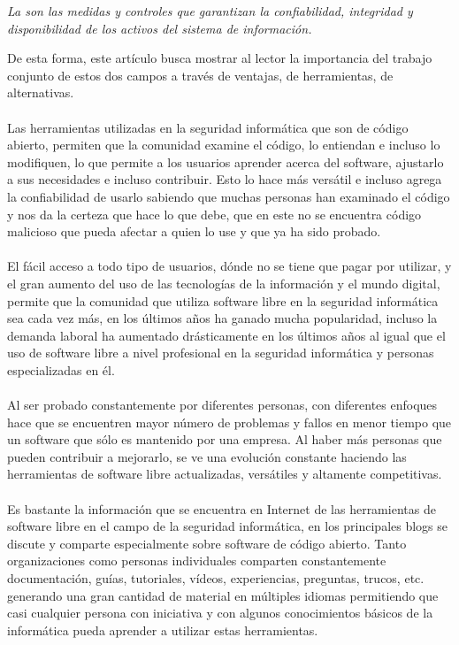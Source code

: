 \begin{multicols}{2}
\vspace{0.3cm}

\begin{entradilla}
{\em La {\color{introcolor}{seguridad informática}} son las medidas y controles que garantizan la confiabilidad, integridad y disponibilidad de los activos del sistema de información.}
\end{entradilla}

De esta forma, este artículo busca mostrar al lector la importancia del trabajo conjunto de estos dos campos a través de ventajas, de herramientas, de alternativas.
\\ \\


Las herramientas utilizadas en la seguridad informática que son de código abierto, permiten que la comunidad examine el código, lo entiendan e incluso lo modifiquen, lo que permite a los usuarios aprender acerca del software, ajustarlo a sus necesidades e incluso contribuir. Esto lo hace más versátil e incluso agrega la confiabilidad de usarlo sabiendo que muchas personas han examinado el código y nos da la certeza que hace lo que debe, que en este no se encuentra código malicioso que pueda afectar a quien lo use y que ya ha sido probado.
\\
\\
El fácil acceso a todo tipo de usuarios, dónde no se tiene que pagar por utilizar, y el gran aumento del uso de las tecnologías de la información y el mundo digital, permite que la comunidad que utiliza software libre en la seguridad informática sea cada vez más, en los últimos años ha ganado mucha popularidad, incluso la demanda laboral ha aumentado drásticamente en los últimos años al igual que el uso de software libre a nivel profesional en la seguridad informática y personas especializadas en él.
\\
\\
Al ser probado constantemente por diferentes personas, con diferentes enfoques hace que se encuentren mayor número de problemas y fallos en menor tiempo que un software que sólo es mantenido por una empresa. Al haber más personas que pueden contribuir a mejorarlo, se ve una evolución constante haciendo las herramientas de software libre actualizadas, versátiles y altamente competitivas.
\\
\\
Es bastante la información que se encuentra en Internet de las herramientas de software libre en el campo de la seguridad informática, en los principales blogs se discute y comparte especialmente sobre software de código abierto. Tanto organizaciones como personas individuales comparten constantemente documentación, guías, tutoriales, vídeos, experiencias, preguntas, trucos, etc. generando una gran cantidad de material en múltiples idiomas permitiendo que casi cualquier persona con iniciativa y con algunos conocimientos básicos de la informática pueda aprender a utilizar estas herramientas.


\end{multicols}
